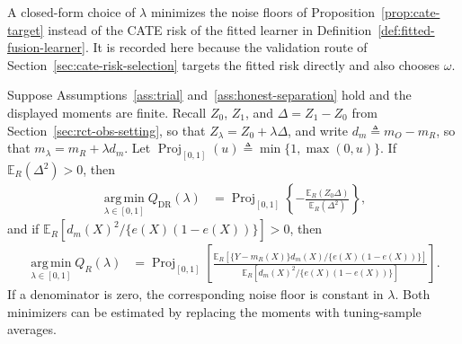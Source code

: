 A closed-form choice of $\lambda$ minimizes the noise floors of Proposition~\ref{prop:cate-target} instead of the CATE risk of the fitted learner in Definition~\ref{def:fitted-fusion-learner}. It is recorded here because the validation route of Section~\ref{sec:cate-risk-selection} targets the fitted risk directly and also chooses $\omega$.

\begin{proposition}
\label{prop:cate-noise-floor-lambda}
Suppose Assumptions~\ref{ass:trial} and~\ref{ass:honest-separation} hold and the displayed moments are finite. Recall $Z_0$, $Z_1$, and $\Delta=Z_1-Z_0$ from Section~\ref{sec:rct-obs-setting}, so that $Z_\lambda=Z_0+\lambda\Delta$, and write $d_m\triangleq m_O-m_R$, so that $m_\lambda=m_R+\lambda d_m$. Let $\operatorname{Proj}_{[0,1]}(u)\triangleq\min\{1,\max(0,u)\}$. If $\mathbb E_R(\Delta^2)>0$, then
\begin{align}
\operatorname*{arg\,min}_{\lambda\in[0,1]}Q_{\mathrm{DR}}(\lambda)
&=\operatorname{Proj}_{[0,1]}\left\{-\frac{\mathbb E_R(Z_0\Delta)}{\mathbb E_R(\Delta^2)}\right\},
\label{eq:cate-dr-noise-lambda}
\end{align}
and if $\mathbb E_R[d_m(X)^2/\{e(X)(1-e(X))\}]>0$, then
\begin{align}
\operatorname*{arg\,min}_{\lambda\in[0,1]}Q_R(\lambda)
&=\operatorname{Proj}_{[0,1]}\left[
\frac{\mathbb E_R[\{Y-m_R(X)\}d_m(X)/\{e(X)(1-e(X))\}]}
{\mathbb E_R[d_m(X)^2/\{e(X)(1-e(X))\}]}\right].
\label{eq:cate-r-noise-lambda}
\end{align}
If a denominator is zero, the corresponding noise floor is constant in $\lambda$. Both minimizers can be estimated by replacing the moments with tuning-sample averages.
\end{proposition}

